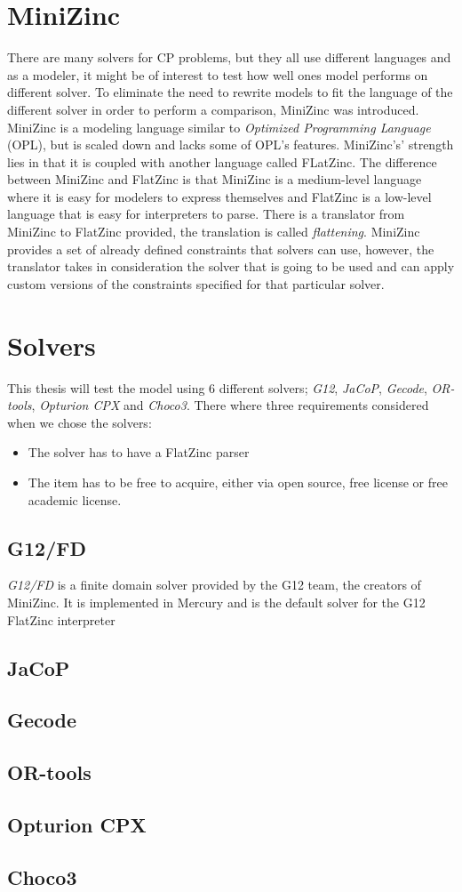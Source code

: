 \section{MiniZinc}
There are many solvers for CP problems, but they all use different languages and as a modeler, it might be of interest to test how well ones model performs on different solver. To eliminate the need to rewrite models to fit the language of the different solver in order to perform a comparison, MiniZinc was introduced. MiniZinc is a modeling language similar to \emph{Optimized Programming Language} (OPL), but is scaled down and lacks some of OPL's features. MiniZinc's' strength lies in that it is coupled with another language called FLatZinc. The difference between MiniZinc and FlatZinc is that MiniZinc is a medium-level language where it is easy for modelers to express themselves and FlatZinc is a low-level language that is easy for interpreters to parse. There is a translator from MiniZinc to FlatZinc provided, the translation is called \emph{flattening}. MiniZinc provides a set of already defined constraints that solvers can use, however, the translator takes in consideration the solver that is going to be used and can apply custom versions of the constraints specified for that particular solver.
\cite{mz_paper}

\section{Solvers}
This thesis will test the model using 6 different solvers; \emph{G12}, \emph{JaCoP}, \emph{Gecode}, \emph{OR-tools}, \emph{Opturion CPX} and \emph{Choco3}. There where three requirements considered when we chose the solvers:
\begin{itemize}
\item The solver has to have a FlatZinc parser
\item The item has to be free to acquire, either via open source, free license or free academic license.
\end{itemize}

\subsection{G12/FD}
\emph{G12/FD} is a finite domain solver provided by the G12 team, the creators of MiniZinc. It is implemented in Mercury and is the default solver for the G12 FlatZinc interpreter
\cite{nicta_2964}
\cite{mz_result_2014}
\subsection{JaCoP}
\cite{jacop_overview}
\subsection{Gecode}
\cite{gecode}
\subsection{OR-tools}
\cite{or_manual}
\subsection{Opturion CPX}
\cite{cpx}
\subsection{Choco3}
\cite{choco}